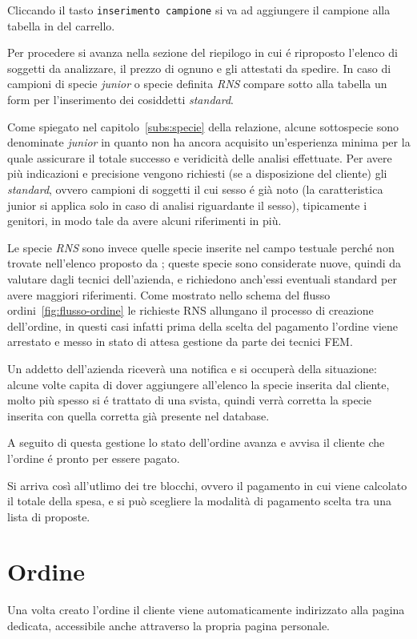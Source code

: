 Cliccando il tasto \texttt{inserimento campione} si va ad aggiungere il campione alla tabella in del carrello.

Per procedere si avanza nella sezione del \textsf{riepilogo} in cui é riproposto l'elenco di soggetti da analizzare, il prezzo di ognuno e gli attestati da spedire. In caso di campioni di specie \emph{junior} o specie definita \emph{RNS} compare sotto alla tabella un form per l'inserimento dei cosiddetti \emph{standard}.

Come spiegato nel capitolo~\ref{subs:specie} della relazione, alcune sottospecie sono denominate \emph{junior} in quanto {\fem} non ha ancora acquisito un'esperienza minima per la quale assicurare il totale successo e veridicità delle analisi effettuate. Per avere più indicazioni e precisione vengono richiesti (se a disposizione del cliente) gli \emph{standard}, ovvero campioni di soggetti il cui sesso é già noto (la caratteristica junior si applica solo in caso di analisi riguardante il sesso), tipicamente i genitori, in modo tale da avere alcuni riferimenti in più.

Le specie \emph{RNS} sono invece quelle specie inserite nel campo testuale perché non trovate nell'elenco proposto da {\fem}; queste specie sono considerate nuove, quindi da valutare dagli tecnici dell'azienda, e richiedono anch'essi eventuali standard per avere maggiori riferimenti. Come mostrato nello schema del flusso ordini~\ref{fig:flusso-ordine} le richieste RNS allungano il processo di creazione dell'ordine, in questi casi infatti prima della scelta del pagamento l'ordine viene arrestato e messo in stato di \textsf{attesa gestione da parte dei tecnici FEM}.

Un addetto dell'azienda riceverà una notifica e si occuperà della situazione: alcune volte capita di dover aggiungere all'elenco la specie inserita dal cliente, molto più spesso si é trattato di una svista, quindi verrà corretta la specie inserita con quella corretta già presente nel database.

A seguito di questa gestione lo stato dell'ordine avanza e avvisa il cliente che l'ordine é pronto per essere pagato.

Si arriva così all'utlimo dei tre blocchi, ovvero il \textsf{pagamento} in cui viene calcolato il totale della spesa, e si può scegliere la modalità di pagamento scelta tra una lista di proposte.

\section*{Ordine}
Una volta creato l'ordine il cliente viene automaticamente indirizzato alla pagina dedicata, accessibile anche attraverso la propria pagina personale.

